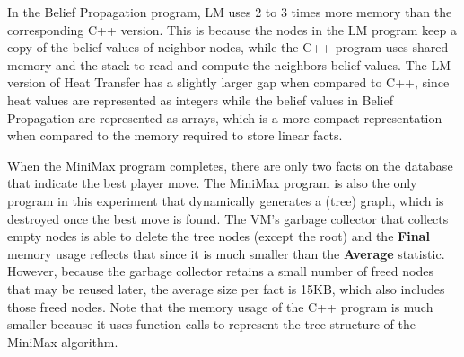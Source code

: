 In the Belief Propagation program, LM uses 2 to 3 times more memory than the
corresponding C++ version. This is because the nodes in the LM program keep a
copy of the belief values of neighbor nodes, while the C++ program uses shared
memory and the stack to read and compute the neighbors belief values. The LM
version of Heat Transfer has a slightly larger gap when compared to C++, since
heat values are represented as integers while the belief values in Belief
Propagation are represented as arrays, which is a more compact representation
when compared to the memory required to store linear facts.

\begin{table}[ht]
   \begin{center}
      
   \end{center}


   \label{table:implementation:mem}
\end{table}

\begin{table}[ht]
   \begin{center}
      
   \end{center}


   \label{table:implementation:cmem}
\end{table}

When the MiniMax program completes, there are only two facts on the database
that indicate the best player move. The MiniMax program is also the only program
in this experiment that dynamically generates a (tree) graph, which is destroyed
once the best move is found. The VM's garbage collector that collects empty
nodes is able to delete the tree nodes (except the root) and the \textbf{Final}
memory usage reflects that since it is much smaller than the \textbf{Average}
statistic. However, because the garbage collector retains a small number of
freed nodes that may be reused later, the average size per fact is 15KB, which
also includes those freed nodes. Note that the memory usage of the C++ program
is much smaller because it uses function calls to represent the tree structure
of the MiniMax algorithm.


